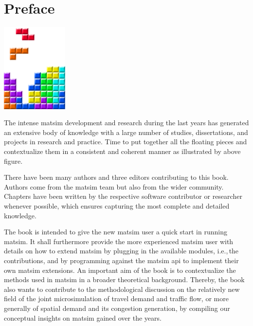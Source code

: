 \chapter*{Preface}

\begin{center} \includegraphics[width=0.25\textwidth, angle=0]{figures/MATSimBook.png} \end{center}

The intense \gls{matsim} development and research during the last years has generated an extensive body of knowledge with a large number of studies, dissertations, and projects in research and practice. Time to put together all the floating pieces and contextualize them in a consistent and coherent manner as illustrated by above figure. 

There have been many authors and three editors contributing to this book. Authors come from the \gls{matsim} team but also from the wider community. Chapters have been written by the respective software contributor or researcher whenever possible, which ensures capturing the most complete and detailed knowledge.

The book is intended to give the new \gls{matsim} user a quick start in running \gls{matsim}. It shall furthermore provide the more experienced \gls{matsim} user with details on how to extend \gls{matsim} by plugging in the available modules, i.e.,\,the \glspl{contribution}, and by programming against the \gls{matsim} \gls{api} to implement their own \gls{matsim} \glspl{extension}. An important aim of the book is to contextualize the methods used in \gls{matsim} in a broader theoretical background. Thereby, the book also wants to contribute to the methodological discussion on the relatively new field of the joint \gls{microsimulation} of travel demand and traffic flow, or more generally of spatial demand and its congestion generation, by compiling our conceptual insights on \gls{matsim} gained over the years.

